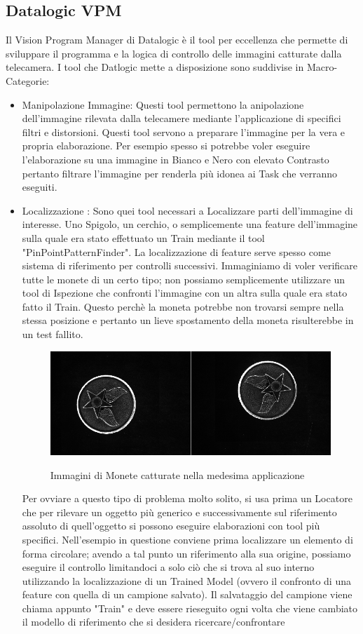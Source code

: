 \documentclass[12pt, a4paper, oneside]{book}
\begin{document}
\subsection{Datalogic VPM}
Il Vision Program Manager di Datalogic è il tool per eccellenza che permette di sviluppare il programma e la logica di controllo delle immagini catturate dalla telecamera. I tool che Datlogic mette a disposizione sono suddivise in Macro-Categorie:
\begin{itemize}
\item Manipolazione Immagine: Questi tool permettono la anipolazione dell'immagine rilevata dalla telecamere mediante l'applicazione di specifici filtri e distorsioni. Questi tool servono a preparare l'immagine per la vera e propria elaborazione. Per esempio spesso si potrebbe voler eseguire l'elaborazione su una immagine in Bianco e Nero con elevato Contrasto pertanto filtrare l'immagine per renderla più idonea ai Task che verranno eseguiti. 
	\item Localizzazione : Sono quei tool necessari a Localizzare parti  dell'immagine di interesse. Uno Spigolo, un cerchio, o semplicemente una feature dell'immagine sulla quale era stato effettuato un Train mediante il tool "PinPointPatternFinder". La localizzazione di feature serve spesso come sistema di riferimento per controlli successivi. Immaginiamo di voler verificare tutte le monete di un certo tipo; non possiamo semplicemente utilizzare un tool di Ispezione che confronti l'immagine con un altra sulla quale era stato fatto il Train. Questo perchè la moneta potrebbe non trovarsi sempre nella stessa posizione e pertanto un lieve spostamento della moneta risulterebbe in un test fallito.
	
	\begin{figure}[H]
		\centering
		\includegraphics[width=13cm]{Immagini/VIS1}
		\label{vis1}
		\caption{Immagini di Monete catturate nella medesima applicazione}
	\end{figure}

	Per ovviare a questo tipo di problema molto solito, si usa prima un Locatore che per rilevare un oggetto più generico e successivamente sul riferimento assoluto di quell'oggetto si possono eseguire elaborazioni con tool più specifici. Nell'esempio in questione conviene prima localizzare un elemento di forma circolare; avendo a tal punto un riferimento alla sua origine, possiamo eseguire il controllo limitandoci a solo ciò che si trova al suo interno utilizzando la localizzazione di un Trained Model (ovvero il confronto di una feature con quella di un campione salvato). Il salvataggio del campione viene chiama appunto "Train" e deve essere rieseguito ogni volta che viene cambiato il modello di riferimento che si desidera ricercare/confrontare
	

\end{itemize}
\end{document}
